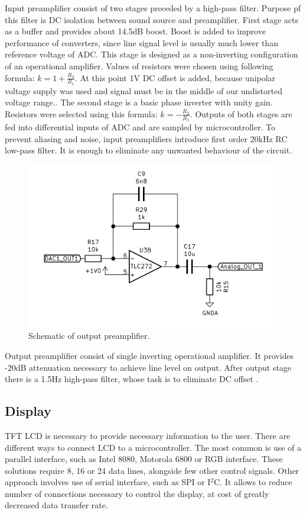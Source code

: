 \documentclass[a4paper,twoside,12pt]{book}
\begin{document}
Input preamplifier consist of two stages
preceded by a high-pass filter.
Purpose pf this filter is DC isolation between sound source
and preamplifier.
First stage acts as a buffer and provides about 14.5dB boost.
Boost is added to improve performance of converters,
since line signal level is usually much lower than reference voltage of ADC.
This stage is designed as a non-inverting configuration of an operational amplifier.
Values of resistors were chosen using following formula:
\(k = 1+\frac{R_2}{R_1}\).
At this point 1V DC offset is added, because unipolar voltage supply was used
and signal must be in the middle of our undistorted voltage range..
The second stage is a basic phase inverter with unity gain.
Resistors were selected using this formula:
\(k = -\frac{R_2}{R_1}\).
Outputs of both stages are fed into differential inputs of ADC
and are sampled by microcontroller.
To prevent aliasing and noise,
input preamplifiers introduce first order 20kHz RC low-pass filter.
It is enough to eliminate any unwanted behaviour of the circuit.

\begin{figure}[H]
    \centering
    \includegraphics[width=\textwidth]{images/Output_preamp}
    \caption{Schematic of output preamplifier.}
    \label{fig:output}
\end{figure}

Output preamplifier consist of single inverting operational amplifier.
It provides -20dB attenuation necessary to achieve line level on output.
After output stage there is a 1.5Hz high-pass filter,
whose task is to eliminate DC offset
\cite{ST:DAC}.

\subsection{Display}
TFT LCD is necessary to provide necessary information to the user.
There are different ways to connect LCD to a microcontroller.
The most common is use of a parallel interface,
such as Intel 8080, Motorola 6800 or RGB interface.
These solutions require 8, 16 or 24 data lines,
alongside few other control signals.
Other approach involves use of serial interface,
such as SPI or I\(^2\)C.
It allows to reduce number of connections necessary to control the display,
at cost of greatly decreased data transfer rate.
\end{document}
